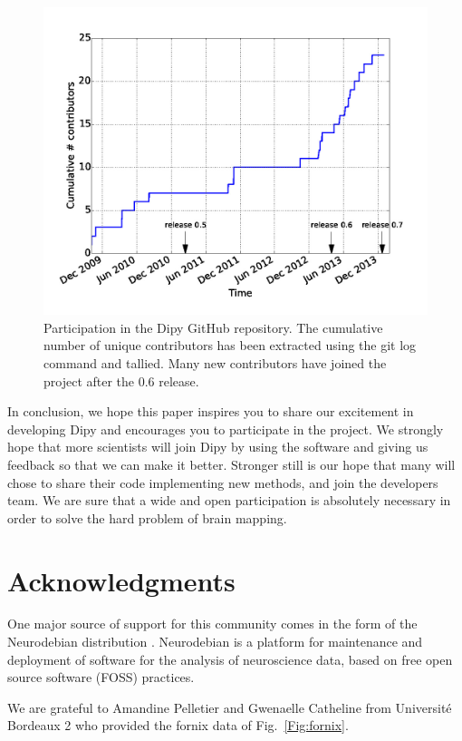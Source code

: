 \documentclass{bioinfo}
\begin{document}
\begin{figure}
\centering{}
\includegraphics[scale=0.37]{Figures/fig-gh2.jpg}
\caption{Participation in the Dipy GitHub repository. The cumulative number of
  unique contributors has been extracted using the git log command and tallied. Many
  new contributors have joined the project after the 0.6 release. \label{Fig:gh_stats}}
\end{figure}

In conclusion, we hope this paper inspires you to share our excitement in developing Dipy and encourages
you to participate in the project. We strongly hope that more scientists will join
Dipy by using the software and giving us feedback so that we can make it better. Stronger still
is our hope that many will chose to share their code implementing new methods, and join the developers team. We are sure that
a wide and open participation is absolutely necessary in order to solve the hard problem of brain mapping.


\section*{Acknowledgments}
One major source of support for this community comes in the form of the Neurodebian
distribution \citep{Halchenko2012}. Neurodebian is a platform for maintenance
and deployment of software for the analysis of neuroscience data, based on free
open source software (FOSS) practices.

We are grateful to Amandine Pelletier and Gwenaelle Catheline from Universit\'{e} Bordeaux 2 who provided the fornix data of Fig.~\ref{Fig:fornix}.
\end{document}
